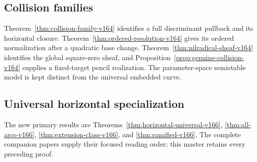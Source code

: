 \documentclass[11pt,reqno]{amsart}
\numberwithin{equation}{section}
\theoremstyle{definition}\newtheorem{definition}[theorem]{Definition}
\theoremstyle{remark}\newtheorem{remark}[theorem]{Remark}
\begin{document}
\subsection{Collision families}
Theorem~\ref{thm:collision-family-v164} identifies a full discriminant
pullback and its horizontal closure. Theorem~\ref{thm:ordered-resolution-v164}
gives its ordered normalization after a quadratic base change.
Theorem~\ref{thm:nilradical-sheaf-v164} identifies the global square-zero
sheaf, and Proposition~\ref{prop:genuine-collision-v164} supplies a
fixed-target pencil realization. The parameter-space semistable
model is kept distinct from the universal embedded curve.

\subsection{Universal horizontal specialization}
The new primary results are Theorems~\ref{thm:horizontal-universal-v166},
\ref{thm:all-arcs-v166}, \ref{thm:extension-class-v166}, and
\ref{thm:ramified-v166}. The complete companion papers supply their
focused reading order; this master retains every preceding proof.
\end{document}

